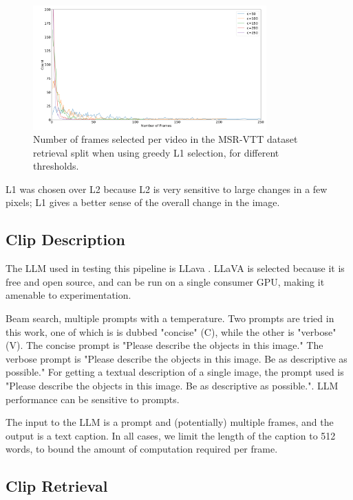 \begin{figure}
      \centering
      \includegraphics[width=0.8\textwidth]{figures/num_frames_histogram.png}
      \caption{Number of frames selected per video in the MSR-VTT dataset retrieval split when using greedy L1 selection, for different thresholds.}
      \label{fig:optical_flow}
\end{figure}

L1 was chosen over L2 because L2 is very sensitive to large changes in a few pixels; L1 gives a better sense of the overall change in the image.

\subsection{Clip Description}

The LLM used in testing this pipeline is LLava \cite{llava}.
LLaVA is selected because it is free and open source, and can be run on a single consumer GPU, making it amenable to experimentation.

Beam search, multiple prompts with a temperature.
Two prompts are tried in this work, one of which is is dubbed "concise" (C), while the other is "verbose" (V).
The concise prompt is "Please describe the objects in this image."
The verbose prompt is "Please describe the objects in this image. Be as descriptive as possible."
For getting a textual description of a single image, the prompt used is "Please describe the objects in this image. Be as descriptive as possible.".
LLM performance can be sensitive to prompts.

The input to the LLM is a prompt and (potentially) multiple frames, and the output is a text caption.
In all cases, we limit the length of the caption to 512 words, to bound the amount of computation required per frame.

\subsection{Clip Retrieval}

